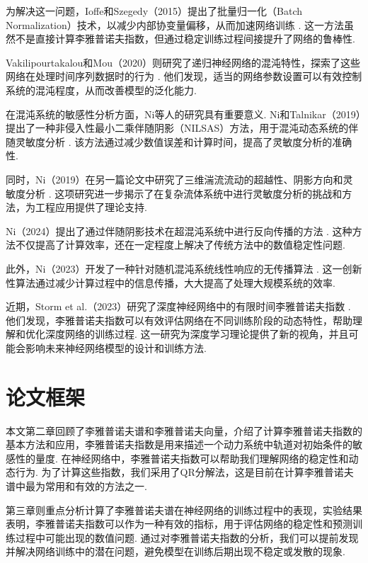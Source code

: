为解决这一问题，Ioffe和Szegedy（2015）提出了批量归一化（Batch Normalization）技术，以减少内部协变量偏移，从而加速网络训练 \cite{ioffe2015batch}. 这一方法虽然不是直接计算李雅普诺夫指数，但通过稳定训练过程间接提升了网络的鲁棒性. 

Vakilipourtakalou和Mou（2020）则研究了递归神经网络的混沌特性，探索了这些网络在处理时间序列数据时的行为 \cite{vakilipourtakalou2020chaotic}. 他们发现，适当的网络参数设置可以有效控制系统的混沌程度，从而改善模型的泛化能力. 

在混沌系统的敏感性分析方面，Ni等人的研究具有重要意义. Ni和Talnikar（2019）提出了一种非侵入性最小二乘伴随阴影（NILSAS）方法，用于混沌动态系统的伴随灵敏度分析 \cite{Ni20191}. 该方法通过减少数值误差和计算时间，提高了灵敏度分析的准确性. 

同时，Ni（2019）在另一篇论文中研究了三维湍流流动的超越性、阴影方向和灵敏度分析 \cite{Ni20192}. 这项研究进一步揭示了在复杂流体系统中进行灵敏度分析的挑战和方法，为工程应用提供了理论支持. 

Ni（2024）提出了通过伴随阴影技术在超混沌系统中进行反向传播的方法 \cite{ni2024backpropagation}. 这种方法不仅提高了计算效率，还在一定程度上解决了传统方法中的数值稳定性问题. 

此外，Ni（2023）开发了一种针对随机混沌系统线性响应的无传播算法 \cite{ni2023nopropagate}. 这一创新性算法通过减少计算过程中的信息传播，大大提高了处理大规模系统的效率. 

近期，Storm et al.（2023）研究了深度神经网络中的有限时间李雅普诺夫指数 \cite{storm2023finitetime}. 他们发现，李雅普诺夫指数可以有效评估网络在不同训练阶段的动态特性，帮助理解和优化深度网络的训练过程. 这一研究为深度学习理论提供了新的视角，并且可能会影响未来神经网络模型的设计和训练方法. 

\section{论文框架}

本文第二章回顾了李雅普诺夫谱和李雅普诺夫向量，介绍了计算李雅普诺夫指数的基本方法和应用，李雅普诺夫指数是用来描述一个动力系统中轨道对初始条件的敏感性的量度. 在神经网络中，李雅普诺夫指数可以帮助我们理解网络的稳定性和动态行为. 为了计算这些指数，我们采用了QR分解法，这是目前在计算李雅普诺夫谱中最为常用和有效的方法之一. 

第三章则重点分析计算了李雅普诺夫谱在神经网络的训练过程中的表现，实验结果表明，李雅普诺夫指数可以作为一种有效的指标，用于评估网络的稳定性和预测训练过程中可能出现的数值问题. 通过对李雅普诺夫指数的分析，我们可以提前发现并解决网络训练中的潜在问题，避免模型在训练后期出现不稳定或发散的现象. 

